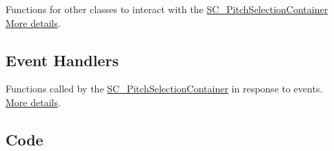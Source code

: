 Functions for other classes to interact with the \hyperlink{class_s_c___pitch_selection_container}{S\+C\+\_\+\+Pitch\+Selection\+Container} ~\newline
 \hyperlink{group___s_c___p_s_c_pub_func}{More details}.\hypertarget{group___doc_s_c___p_s_c_DocSC_PSCHandlers}{}\subsection{Event Handlers}\label{group___doc_s_c___p_s_c_DocSC_PSCHandlers}
Functions called by the \hyperlink{class_s_c___pitch_selection_container}{S\+C\+\_\+\+Pitch\+Selection\+Container} in response to events. ~\newline
 \hyperlink{group___s_c___p_s_c_handlers}{More details}.\hypertarget{group___doc_s_c___p_s_c_DocSC_PSCCode}{}\subsection{Code}\label{group___doc_s_c___p_s_c_DocSC_PSCCode}

